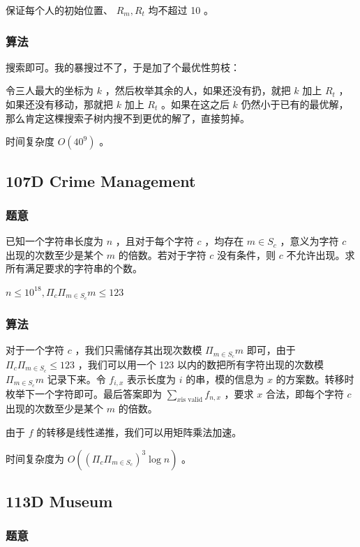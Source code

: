 \documentclass[11pt]{article}
\begin{document}
    保证每个人的初始位置、 $R_m, R_t$ 均不超过 10 。
\subsubsection{算法}
\label{sec-8-1-2}

    搜索即可。我的暴搜过不了，于是加了个最优性剪枝：
\begin{improve}
   令三人最大的坐标为 $k$ ，然后枚举其余的人，如果还没有扔，就把 $k$ 加上 $R_t$ ，如果还没有移动，那就把 $k$ 加上 $R_t$ 。如果在这之后 $k$ 仍然小于已有的最优解，那么肯定这棵搜索子树内搜不到更优的解了，直接剪掉。
\end{improve}

    时间复杂度 $O(40^9)$ 。
\subsection{107D  Crime Management}
\label{sec-8-2}
\subsubsection{题意}
\label{sec-8-2-1}

    已知一个字符串长度为 $n$ ，且对于每个字符 $c$ ，均存在 $m \in S_c$ ，意义为字符 $c$ 出现的次数至少是某个 $m$ 的倍数。若对于字符 $c$ 没有条件，则 $c$ 不允许出现。求所有满足要求的字符串的个数。

    $n \leq 10^18, \Pi_c \Pi_{m \in S_c} m \leq 123$
\subsubsection{算法}
\label{sec-8-2-2}

    对于一个字符 $c$ ，我们只需储存其出现次数模 $\Pi_{m \in S_c} m$ 即可，由于 $\Pi_c \Pi_{m \in S_c} \leq 123$ ，我们可以用一个 123 以内的数把所有字符出现的次数模 $\Pi_{m \in S_c} m$ 记录下来。令 $f_{i, x}$ 表示长度为 $i$ 的串，模的信息为 $x$ 的方案数。转移时枚举下一个字符即可。最后答案即为 $\sum_{x \text{is valid}} f_{n, x}$ ，要求 $x$ 合法，即每个字符 $c$ 出现的次数至少是某个 $m$ 的倍数。

    由于 $f$ 的转移是线性递推，我们可以用矩阵乘法加速。

    时间复杂度为 $O((\Pi_c \Pi_{m \in S_c})^3 \log n)$ 。
\subsection{113D  Museum}
\label{sec-8-3}
\subsubsection{题意}
\label{sec-8-3-1}
\end{document}
